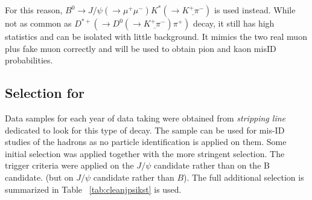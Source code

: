 
For this reason, $B^{0} \rightarrow J/\psi(\rightarrow \mu^{+} \mu^{-}) K^{*}(\rightarrow \underline{K^{+} \pi^{-}})$ is used instead. While not as common as $D^{*+}(\rightarrow D^{0}(\rightarrow \underline{K^{+} \pi^{-}}) \pi^{+})$ decay, it still has high statistics and can be isolated with little background. It mimics the two real muon plus fake muon correctly and will be used to obtain pion and kaon misID probabilities.

\subsection{Selection for   }
Data samples for each year of data taking were obtained from \textit{stripping line} dedicated to look for this type of decay. The sample can be used for mis-ID studies of the hadrons as no particle identification is applied on them. Some initial selection was applied together with the more stringent \Bmumumu selection.  The trigger criteria were applied on the $J/\psi$ candidate rather than on the B candidate. (but on $J/\psi$ candidate rather than $B$). The full additional selection is summarized in Table ~\ref{tab:cleanjpsikst} is used.



